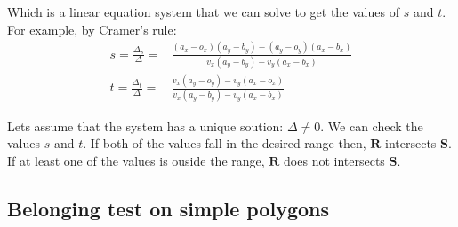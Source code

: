Which is a linear equation system that we can solve to get the values of $s$ and $t$. For example, by Cramer's rule:
\begin{align*}
s = \frac{\Delta_s}{\Delta} =&  \frac{(a_x - o_x)(a_y - b_y) - (a_y - o_y)(a_x - b_x)}{v_x(a_y - b_y) - v_y(a_x - b_x)} \\
t = \frac{\Delta_t}{\Delta} =&  \frac{v_x(a_y - o_y) - v_y(a_x - o_x)}{v_x(a_y - b_y) - v_y(a_x - b_x)}
\end{align*}

Lets assume that the system has a unique soution: $\Delta \neq 0$. We can check the values $s$ and $t$. If both of the values fall in the desired range then, $\mathbf{R}$ intersects $\mathbf{S}$. If at least one of the values is ouside the range, $\mathbf{R}$ does not intersects $\mathbf{S}$.


\subsection{Belonging test on simple polygons}

